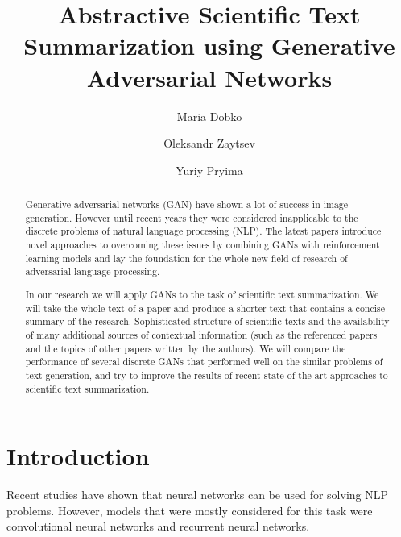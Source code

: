 \documentclass[sigplan]{acmart}
\begin{document}
\title{Abstractive Scientific Text Summarization using Generative Adversarial Networks}

\author{Maria Dobko}

\author{Oleksandr Zaytsev}

\author{Yuriy Pryima}

\begin{abstract}
Generative adversarial networks (GAN) have shown a lot of success in image generation. However until recent years they were considered inapplicable to the discrete problems of natural language processing (NLP). The latest papers introduce novel approaches to overcoming these issues by combining GANs with reinforcement learning models and lay the foundation for the whole new field of research of adversarial language processing.

In our research we will apply GANs to the task of scientific text summarization. We will take the whole text of a paper and produce a shorter text that contains a concise summary of the research. Sophisticated structure of scientific texts and the availability of many additional sources of contextual information (such as the referenced papers and the topics of other papers written by the authors). We will compare the performance of several discrete GANs that performed well on the similar problems of text generation, and try to improve the results of recent state-of-the-art approaches to scientific text summarization.
\end{abstract}


\maketitle

\section{Introduction}
Recent studies have shown that neural networks can be used for solving NLP problems. However, models that were mostly considered for this task were convolutional neural networks and recurrent neural networks.
\end{document}

